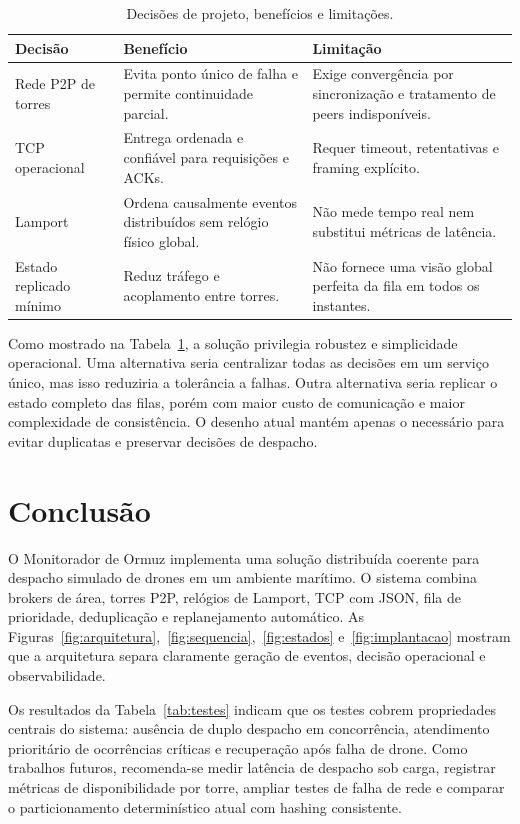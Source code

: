 \documentclass[12pt]{article}
\begin{document}
\begin{table}[H]
\centering
\caption{Decisões de projeto, benefícios e limitações.}
\label{tab:riscos}
\begin{tabularx}{\textwidth}{p{3.2cm}p{4.5cm}X}
\toprule
Decisão & Benefício & Limitação \\
\midrule
Rede P2P de torres & Evita ponto único de falha e permite continuidade parcial. & Exige convergência por sincronização e tratamento de peers indisponíveis. \\
TCP operacional & Entrega ordenada e confiável para requisições e ACKs. & Requer timeout, retentativas e framing explícito. \\
Lamport & Ordena causalmente eventos distribuídos sem relógio físico global. & Não mede tempo real nem substitui métricas de latência. \\
Estado replicado mínimo & Reduz tráfego e acoplamento entre torres. & Não fornece uma visão global perfeita da fila em todos os instantes. \\
\bottomrule
\end{tabularx}
\end{table}

Como mostrado na Tabela~\ref{tab:riscos}, a solução privilegia robustez e simplicidade operacional. Uma alternativa seria centralizar todas as decisões em um serviço único, mas isso reduziria a tolerância a falhas. Outra alternativa seria replicar o estado completo das filas, porém com maior custo de comunicação e maior complexidade de consistência. O desenho atual mantém apenas o necessário para evitar duplicatas e preservar decisões de despacho.

\section{Conclusão}

O Monitorador de Ormuz implementa uma solução distribuída coerente para despacho simulado de drones em um ambiente marítimo. O sistema combina brokers de área, torres P2P, relógios de Lamport, TCP com JSON, fila de prioridade, deduplicação e replanejamento automático. As Figuras~\ref{fig:arquitetura},~\ref{fig:sequencia},~\ref{fig:estados} e~\ref{fig:implantacao} mostram que a arquitetura separa claramente geração de eventos, decisão operacional e observabilidade.

Os resultados da Tabela~\ref{tab:testes} indicam que os testes cobrem propriedades centrais do sistema: ausência de duplo despacho em concorrência, atendimento prioritário de ocorrências críticas e recuperação após falha de drone. Como trabalhos futuros, recomenda-se medir latência de despacho sob carga, registrar métricas de disponibilidade por torre, ampliar testes de falha de rede e comparar o particionamento determinístico atual com hashing consistente.



\end{document}
